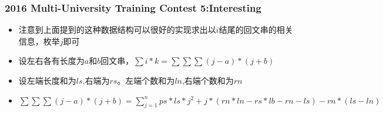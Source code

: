 \documentclass[notheorems]{beamer}
\begin{document}
\begin{frame}
\frametitle{2016 Multi-University Training Contest 5:Interesting}
\begin{itemize}
\pause
\item 注意到上面提到的这种数据结构可以很好的实现求出以$i$结尾的回文串的相关信息，枚举$j$即可
\pause
\item 设左右各有长度为$a$和$b$回文串，$\sum i*k = \sum \sum \sum (j-a)*(j+b)$
\item 设左端长度和为$ls$,右端为$rs$。左端个数和为$ln$,右端个数和为$rn$
\pause
\item $\sum \sum \sum (j-a)*(j+b) = \sum_{j=1}^n ps*ls*j^2+j*(rn*ln - rs*lb - rn-ls) - rn*(ls - ln)$ 
\end{itemize}
\end{frame}
\end{document}
